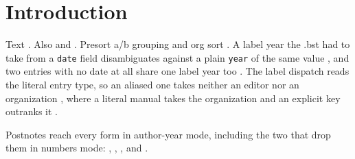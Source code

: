 \documentclass[acmsmall,nonacm]{acmart}
\begin{document}
\thispagestyle{empty}%

\section{Introduction}
Text \citep{smithA,smithB}. Also \citet{jones} and \citep{green}.
Presort a/b grouping \citep{grpA,grpB,grpC} and org sort \citep{OrgProc}.
A label year the .bst had to take from a \texttt{date} field disambiguates against a plain \texttt{year} of the same value \citep{dtYear,dtDate}, and two entries with no date at all share one label year too \citep{ndOne,ndTwo}.
The label dispatch reads the literal entry type, so an aliased one takes neither an editor nor an organization \citep{OnlOrg,ColEd,DatEd}, where a literal manual takes the organization \citep{ManOrg} and an explicit key outranks it \citep{WebKey}.

Postnotes reach every form in author-year mode, including the two that drop them in numbers mode: \citep[p.~5]{jones}, \citet[p.~5]{jones}, \citeauthor[p.~5]{jones}, and \citeyear[p.~5]{jones}.



\end{document}
